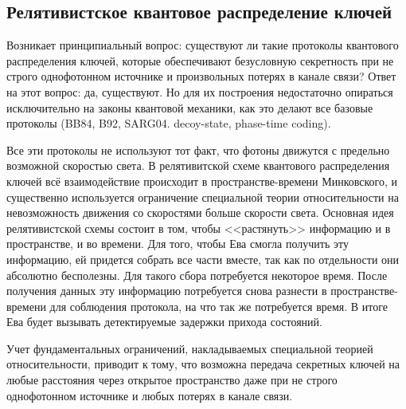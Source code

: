 \subsection{Релятивистское квантовое распределение ключей}
Возникает принципиальный вопрос: существуют ли такие протоколы квантового распределения ключей, которые обеспечивают безусловную секретность при не строго однофотонном источнике и произвольных потерях в канале связи? Ответ на этот вопрос: да, существуют. Но для их построения недостаточно опираться исключительно на законы квантовой механики, как это делают все базовые протоколы (BB84\cite{bb84}, B92\cite{non_orthogonal_states_discrimination_theorem}, SARG04\cite{sarg04}. decoy-state\cite{decoy_states_protocol}, phase-time coding\cite{phase_time_protocol}). 

Все эти протоколы не используют тот факт, что фотоны движутся с предельно возможной скоростью света. 
В релятивитской схеме квантового распределения ключей всё взаимодействие происходит в пространстве-времени Минковского, и существенно используется ограничение специальной теории относительности на невозможность движения со скоростями больше скорости света. Основная идея релятивистской схемы состоит в том, чтобы <<растянуть>> информацию и в пространстве, и во времени. Для того, чтобы Ева смогла получить эту информацию, ей придется собрать все части вместе, так как по отдельности они абсолютно бесполезны. Для такого сбора потребуется некоторое время. После получения данных эту информацию потребуется снова разнести в пространстве-времени для соблюдения протокола, на что так же потребуется время. В итоге Ева будет вызывать детектируемые задержки прихода состояний.

Учет фундаментальных ограничений, накладываемых специальной теорией относительности, приводит к тому, что возможна передача секретных ключей на любые расстояния через открытое пространство даже при не строго однофотонном источнике и любых потерях в канале связи.

